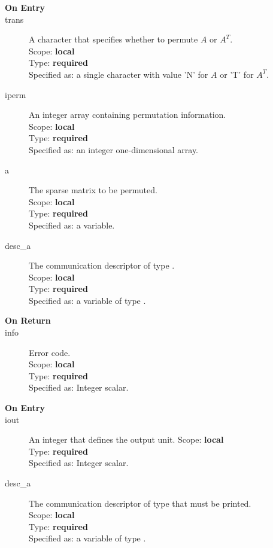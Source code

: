 \begin{description}
\item[\bf On Entry]
\item[trans] A character that specifies whether to permute $A$  or $A^T$.\\
Scope: {\bf local} \\
Type: {\bf required}\\
Specified as: a single character with value 'N' for $A$ or 'T' for $A^T$.\\
\item[iperm] An integer array containing permutation information.\\
Scope: {\bf local} \\
Type: {\bf required}\\
Specified as: an integer one-dimensional array.\\
\item[a] The sparse matrix to be permuted.\\
Scope: {\bf local} \\
Type: {\bf required}\\
Specified as: a \spdata variable.\\
\item[desc\_a] The communication descriptor of type \descdata.\\
Scope: {\bf local} \\
Type: {\bf required}\\
Specified as: a variable of type \descdata.\\
\end{description}

\begin{description}
\item[\bf On Return]
\item[info] Error code.\\
Scope: {\bf local} \\
Type: {\bf required}\\
Specified as: Integer scalar.\\
\end{description}


%
%


\begin{description}
\item[\bf On Entry]
\item[iout] An integer that defines the output unit.
Scope: {\bf local} \\
Type: {\bf required}\\
Specified as: Integer scalar.\\
\item[desc\_a] The communication descriptor of type \descdata that
  must be printed.\\
Scope: {\bf local} \\
Type: {\bf required}\\
Specified as: a variable of type \descdata.\\
\end{description}

